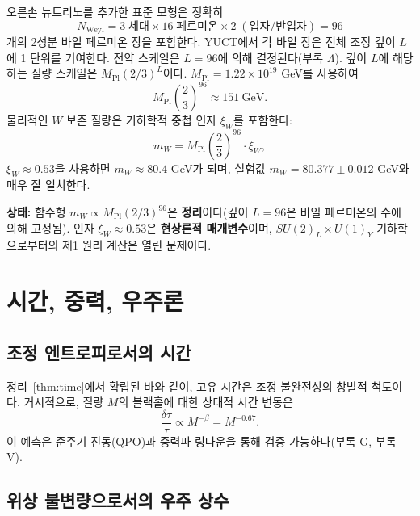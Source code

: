 \documentclass[12pt,a4paper]{article}
\begin{document}
	오른손 뉴트리노를 추가한 표준 모형은 정확히
	\begin{equation}
		N_{\mathrm{Weyl}} = 3\;\text{세대} \times 16\;\text{페르미온} \times 2\;(\text{입자/반입자}) = 96
	\end{equation}
	개의 2성분 바일 페르미온 장을 포함한다. YUCT에서 각 바일 장은 전체 조정 깊이 \(L\)에 1 단위를 기여한다. 전약 스케일은 \(L = 96\)에 의해 결정된다(부록 \(\Lambda\)). 깊이 \(L\)에 해당하는 질량 스케일은 \(M_{\mathrm{Pl}} (2/3)^{L}\)이다. \(M_{\mathrm{Pl}} = 1.22 \times 10^{19}\) GeV를 사용하여
	\begin{equation}
		M_{\mathrm{Pl}} \left(\frac{2}{3}\right)^{96} \approx 151\ \mathrm{GeV}.
	\end{equation}
	물리적인 \(W\) 보존 질량은 기하학적 중첩 인자 \(\xi_W\)를 포함한다:
	\begin{equation}
		m_W = M_{\mathrm{Pl}} \left(\frac{2}{3}\right)^{96} \cdot \xi_W,
		\label{eq:mw}
	\end{equation}
	\(\xi_W \approx 0.53\)을 사용하면 \(m_W \approx 80.4\) GeV가 되며, 실험값 \(m_W = 80.377 \pm 0.012\) GeV와 매우 잘 일치한다.
	
	\textbf{상태:} 함수형 \(m_W \propto M_{\mathrm{Pl}} (2/3)^{96}\)은 \textbf{정리}이다(깊이 \(L=96\)은 바일 페르미온의 수에 의해 고정됨). 인자 \(\xi_W \approx 0.53\)은 \textbf{현상론적 매개변수}이며, \(SU(2)_L \times U(1)_Y\) 기하학으로부터의 제1 원리 계산은 열린 문제이다.
	
	\section{시간, 중력, 우주론}
	\label{sec:cosmology}
	
	\subsection{조정 엔트로피로서의 시간}
	
	정리~\ref{thm:time}에서 확립된 바와 같이, 고유 시간은 조정 불완전성의 창발적 척도이다. 거시적으로, 질량 \(M\)의 블랙홀에 대한 상대적 시간 변동은
	\begin{equation}
		\boxed{\frac{\delta \tau}{\tau} \propto M^{-\beta} = M^{-0.67}}.
	\end{equation}
	이 예측은 준주기 진동(QPO)과 중력파 링다운을 통해 검증 가능하다(부록 G, 부록 V).
	
	\subsection{위상 불변량으로서의 우주 상수}
	
\end{document}
